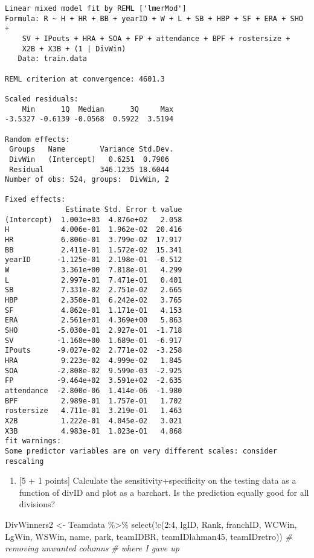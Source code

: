\documentclass[
]{article}
\newenvironment{Shaded}{\begin{snugshade}}{\end{snugshade}}
\newcommand{\CommentTok}[1]{\textcolor[rgb]{0.56,0.35,0.01}{\textit{#1}}}
\newcommand{\DecValTok}[1]{\textcolor[rgb]{0.00,0.00,0.81}{#1}}
\newcommand{\FunctionTok}[1]{\textcolor[rgb]{0.00,0.00,0.00}{#1}}
\newcommand{\NormalTok}[1]{#1}
\newcommand{\OtherTok}[1]{\textcolor[rgb]{0.56,0.35,0.01}{#1}}
\newcommand{\SpecialCharTok}[1]{\textcolor[rgb]{0.00,0.00,0.00}{#1}}
\providecommand{\tightlist}{%
  \setlength{\itemsep}{0pt}\setlength{\parskip}{0pt}}
\begin{document}
\begin{verbatim}
Linear mixed model fit by REML ['lmerMod']
Formula: R ~ H + HR + BB + yearID + W + L + SB + HBP + SF + ERA + SHO +  
    SV + IPouts + HRA + SOA + FP + attendance + BPF + rostersize +  
    X2B + X3B + (1 | DivWin)
   Data: train.data

REML criterion at convergence: 4601.3

Scaled residuals: 
    Min      1Q  Median      3Q     Max 
-3.5327 -0.6139 -0.0568  0.5922  3.5194 

Random effects:
 Groups   Name        Variance Std.Dev.
 DivWin   (Intercept)   0.6251  0.7906 
 Residual             346.1235 18.6044 
Number of obs: 524, groups:  DivWin, 2

Fixed effects:
              Estimate Std. Error t value
(Intercept)  1.003e+03  4.876e+02   2.058
H            4.006e-01  1.962e-02  20.416
HR           6.806e-01  3.799e-02  17.917
BB           2.411e-01  1.572e-02  15.341
yearID      -1.125e-01  2.198e-01  -0.512
W            3.361e+00  7.818e-01   4.299
L            2.997e-01  7.471e-01   0.401
SB           7.331e-02  2.751e-02   2.665
HBP          2.350e-01  6.242e-02   3.765
SF           4.862e-01  1.171e-01   4.153
ERA          2.561e+01  4.369e+00   5.863
SHO         -5.030e-01  2.927e-01  -1.718
SV          -1.168e+00  1.689e-01  -6.917
IPouts      -9.027e-02  2.771e-02  -3.258
HRA          9.223e-02  4.999e-02   1.845
SOA         -2.808e-02  9.599e-03  -2.925
FP          -9.464e+02  3.591e+02  -2.635
attendance  -2.800e-06  1.414e-06  -1.980
BPF          2.989e-01  1.757e-01   1.702
rostersize   4.711e-01  3.219e-01   1.463
X2B          1.222e-01  4.045e-02   3.021
X3B          4.983e-01  1.023e-01   4.868
fit warnings:
Some predictor variables are on very different scales: consider rescaling
\end{verbatim}

\begin{enumerate}
\def\labelenumi{\alph{enumi}.}
\setcounter{enumi}{6}
\tightlist
\item
  {[}5 + 1 points{]} Calculate the sensitivity+specificity on the
  testing data as a function of divID and plot as a barchart. Is the
  prediction equally good for all divisions?
\end{enumerate}

\begin{Shaded}
\begin{Highlighting}[]
\NormalTok{DivWinners2 }\OtherTok{\textless{}{-}}\NormalTok{ Teamdata }\SpecialCharTok{\%\textgreater{}\%}
  \FunctionTok{select}\NormalTok{(}\SpecialCharTok{!}\FunctionTok{c}\NormalTok{(}\DecValTok{2}\SpecialCharTok{:}\DecValTok{4}\NormalTok{, lgID, Rank, franchID, WCWin, LgWin, WSWin, name, park, teamIDBR, teamIDlahman45, teamIDretro)) }\CommentTok{\# removing unwanted columns}
\CommentTok{\# where I gave up}
\end{Highlighting}
\end{Shaded}
\end{document}
